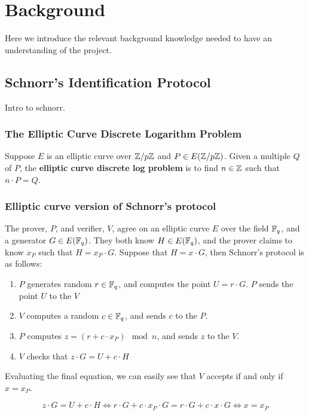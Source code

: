 \section{Background}
\label{sec:background}
Here we introduce the relevant background knowledge needed to have an understanding of the project. 

\subsection{Schnorr's Identification Protocol}
Intro to schnorr.

\subsubsection{The Elliptic Curve Discrete Logarithm Problem}
Suppose $E$ is an elliptic curve over $\mathbb{Z}/p\mathbb{Z}$ and $P \in E(\mathbb{Z}/p\mathbb{Z})$. Given a multiple $Q$ of $P$, the \textbf{elliptic curve discrete log problem} is to find $n \in \mathbb{Z}$ such that $n \cdot P = Q$.

\subsubsection{Elliptic curve version of Schnorr's protocol}
The prover, $P$, and verifier, $V$, agree on an elliptic curve $E$ over the field $\mathbb{F}_q$, and a generator $G \in E(\mathbb{F}_q)$. They both know $H \in E(\mathbb{F}_q)$, and the prover claims to know $x_P$ such that $H = x_P \cdot G$. Suppose that $H = x \cdot G$, then Schnorr's protocol is as follows:

\begin{enumerate}
    \item $P$ generates random $r \in \mathbb{F}_q$, and computes the point $U = r \cdot G$. $P$ sends the point $U$ to the $V$
    \item $V$ computes a random $c \in \mathbb{F}_q$, and sends $c$ to the $P$.
    \item $P$ computes $z = (r + c \cdot x_P) \mod n$, and sends $z$ to the $V$.
    \item $V$ checks that $z \cdot G = U + c \cdot H$
\end{enumerate} 

Evaluating the final equation, we can easily see that $V$ accepts if and only if $x = x_P$. 

\begin{equation*}
    z \cdot G = U + c \cdot H \iff
    r \cdot G + c \cdot x_P \cdot G  = r \cdot G + c \cdot x \cdot G \iff
    x  =  x_P
\end{equation*}

